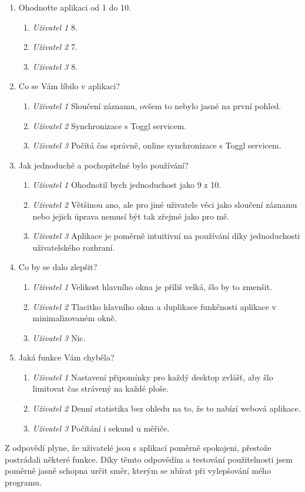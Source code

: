 \documentclass[thesis=B,czech]{FITthesis}[2012/06/26]
\begin{document}
	\begin{enumerate}
	\item Ohodnoťte aplikaci od 1 do 10.
		\begin{enumerate}
		\item \textit{Uživatel 1} 8.
		\item \textit{Uživatel 2} 7.
		\item \textit{Uživatel 3} 8.
		\end{enumerate}
		\item  Co se Vám líbilo v aplikaci?
		\begin{enumerate}
		\item \textit{Uživatel 1} Sloučení záznamu, ovšem to nebylo jasné na první pohled.
		\item \textit{Uživatel 2} Synchronizace s Toggl servicem.
		\item \textit{Uživatel 3} Počítá čas správně, online synchronizace s Toggl servicem.
		\end{enumerate}
		\item  Jak jednoduché a pochopitelné bylo používání?
		\begin{enumerate}
		\item \textit{Uživatel 1} Ohodnotil bych jednoduchost jako 9 z 10.
		\item \textit{Uživatel 2} Většinou ano, ale pro jiné uživatele věci jako sloučení záznamu nebo jejich úprava nemusí být tak zřejmé jako pro mě.
		\item \textit{Uživatel 3} Aplikace je poměrně intuitivní na používání díky jednoduchosti uživatelského rozhraní. 
		\end{enumerate}
		\item  Co by se dalo zlepšit?
		\begin{enumerate}
		\item \textit{Uživatel 1} Velikost hlavního okna je příliš velká, šlo by to zmenšit.
		\item \textit{Uživatel 2} Tlacitko  hlavního okna a duplikace funkčnosti aplikace v minimalizovaném okně.
		\item \textit{Uživatel 3} Nic.
		\end{enumerate}
		\item  Jaká funkce Vám chyběla? 
		\begin{enumerate}
		\item \textit{Uživatel 1} Nastavení připomínky pro každý desktop zvlášť, aby šlo limitovat čas strávený na každé ploše.
		\item \textit{Uživatel 2} Denní statistika bez ohledu na to, že to nabízí webová aplikace.
		\item \textit{Uživatel 3} Počítání i sekund u měřiče.
		\end{enumerate}
\end{enumerate}
	Z odpovědí plyne, že uživatelé jsou s aplikací poměrně spokojeni, přestože postrádali některé funkce. Díky těmto odpovědím a testování použitelnosti jsem poměrně jasně schopna určit směr, kterým se ubírat při vylepšování mého programu.
\end{document}
